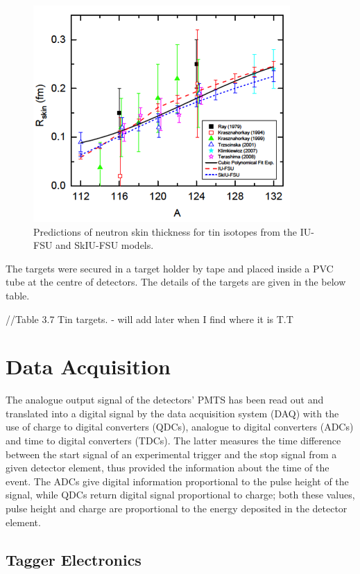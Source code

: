 \begin{figure}[H]
\begin{center}
\includegraphics[scale=0.8]{tiniso.png}
\caption{Predictions of neutron skin thickness for tin isotopes from the IU-FSU and SkIU-FSU models.}
\label{isochain}
\end{center}
\end{figure} 

\indent The targets were secured in a target holder by tape and placed inside a PVC tube at the centre of detectors. The details of the targets are given in the below table.

//Table 3.7 Tin targets. - will add later when I find where it is T.T 

\section{Data Acquisition}

\indent The analogue output signal of the detectors' PMTS has been read out and translated into a digital signal by the data acquisition system (DAQ) with the use of charge to digital converters (QDCs), analogue to digital converters (ADCs) and time to digital converters (TDCs). The latter measures the time difference between the start signal of an experimental trigger and the stop signal from a given detector element, thus provided the information about the time of the event. The ADCs give digital information proportional to the pulse height of the signal, while QDCs return digital signal proportional to charge; both these values, pulse height and charge are proportional to the energy deposited in the detector element.

\subsection{Tagger Electronics}

